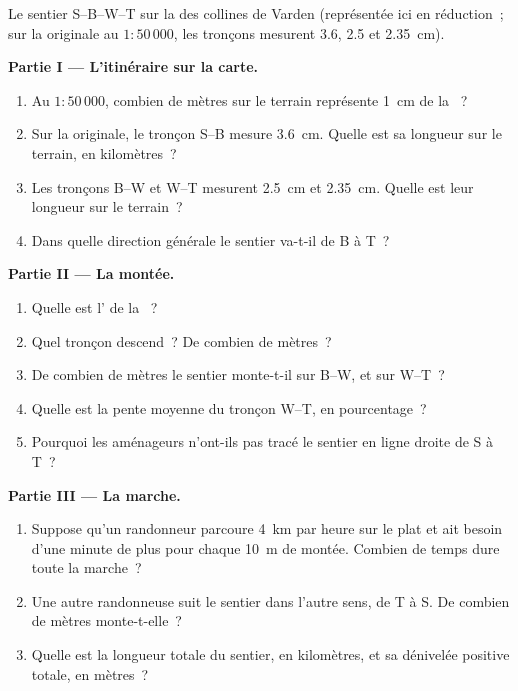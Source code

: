 \begin{problem}
\begin{omfigure}
{\small Le sentier S--B--W--T sur la  des collines de
Varden (représentée ici en réduction~; sur la  originale au
$1 : 50\,000$, les tronçons mesurent 3.6, 2.5 et \qty{2.35}{cm}).}
\label{fig:g9:maps-of-the-earth:path}
\end{omfigure}

\noindent\textbf{Partie I --- L'itinéraire sur la carte.}\par\nopagebreak
\begin{enumerate}[beginpenalty=10000]
  \item Au $1 : 50\,000$, combien de mètres sur le terrain représente
        \qty{1}{cm} de la ~?
  \item Sur la  originale, le tronçon S--B mesure \qty{3.6}{cm}.
        Quelle est sa longueur sur le terrain, en kilomètres~?
  \item Les tronçons B--W et W--T mesurent \qty{2.5}{cm} et
        \qty{2.35}{cm}. Quelle est leur longueur sur le terrain~?
  \item Dans quelle direction générale le sentier va-t-il de B à T~?
\end{enumerate}

\noindent\textbf{Partie II --- La montée.}\par\nopagebreak
\begin{enumerate}[resume, beginpenalty=10000]
  \item Quelle est l' de la ~?
  \item Quel tronçon descend~? De combien de mètres~?
  \item De combien de mètres le sentier monte-t-il sur B--W, et sur W--T~?
  \item Quelle est la pente moyenne du tronçon W--T, en pourcentage~?
  \item Pourquoi les aménageurs n'ont-ils pas tracé le sentier en ligne
        droite de S à T~?
\end{enumerate}

\noindent\textbf{Partie III --- La marche.}\par\nopagebreak
\begin{enumerate}[resume, beginpenalty=10000]
  \item Suppose qu'un randonneur parcoure \qty{4}{km} par heure sur le plat
        et ait besoin d'une minute de plus pour chaque \qty{10}{m} de
        montée. Combien de temps dure toute la marche~?
  \item Une autre randonneuse suit le sentier dans l'autre sens, de T à S.
        De combien de mètres monte-t-elle~?
  \item Quelle est la longueur totale du sentier, en kilomètres, et sa
        dénivelée positive totale, en mètres~?
\end{enumerate}
\end{problem}
